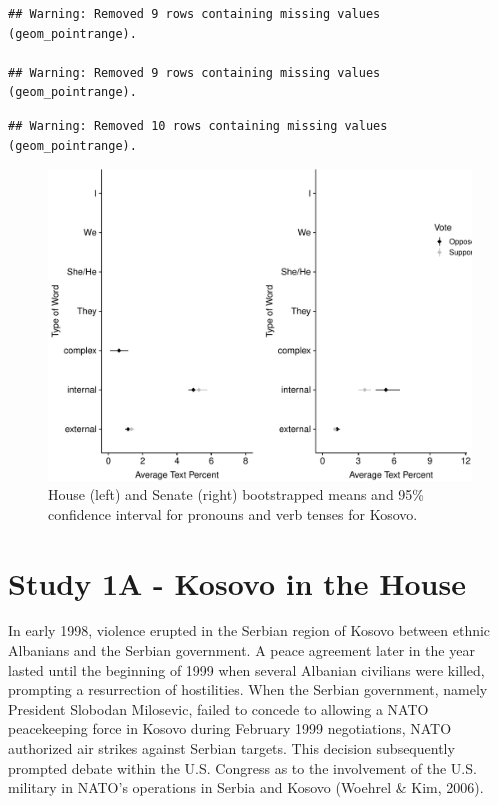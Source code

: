 \documentclass[english,,man,floatsintext]{apa6}
\begin{document}
\begin{verbatim}
## Warning: Removed 9 rows containing missing values (geom_pointrange).

## Warning: Removed 9 rows containing missing values (geom_pointrange).
\end{verbatim}

\begin{verbatim}
## Warning: Removed 10 rows containing missing values (geom_pointrange).
\end{verbatim}

\begin{figure}
\centering
\includegraphics{Language_of_War_Markdown_KJ2_files/figure-latex/Kpic-1.pdf}
\caption{\label{fig:Kpic}House (left) and Senate (right) bootstrapped means and 95\% confidence interval for pronouns and verb tenses for Kosovo.}
\end{figure}

\hypertarget{study-1a---kosovo-in-the-house}{%
\section{Study 1A - Kosovo in the House}\label{study-1a---kosovo-in-the-house}}

In early 1998, violence erupted in the Serbian region of Kosovo between ethnic Albanians and the Serbian government. A peace agreement later in the year lasted until the beginning of 1999 when several Albanian civilians were killed, prompting a resurrection of hostilities. When the Serbian government, namely President Slobodan Milosevic, failed to concede to allowing a NATO peacekeeping force in Kosovo during February 1999 negotiations, NATO authorized air strikes against Serbian targets. This decision subsequently prompted debate within the U.S. Congress as to the involvement of the U.S. military in NATO's operations in Serbia and Kosovo (Woehrel \& Kim, 2006).
\end{document}
